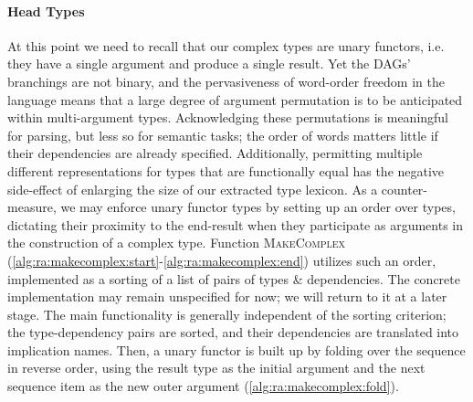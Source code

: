 \paragraph{Head Types}
At this point we need to recall that our complex types are unary functors, i.e. they have a single argument and produce a single result.
Yet the DAGs' branchings are not binary, and the pervasiveness of word-order freedom in the language means that a large degree of argument permutation is to be anticipated within multi-argument types.
Acknowledging these permutations is meaningful for parsing, but less so for semantic tasks; the order of words matters little if their dependencies are already specified.
Additionally, permitting multiple different representations for types that are functionally equal has the negative side-effect of enlarging the size of our extracted type lexicon.
As a counter-measure, we may enforce unary functor types by setting up an order over types, dictating their proximity to the end-result when they participate as arguments in the construction of a complex type.
Function \textsc{MakeComplex} (\ref{alg:ra:makecomplex:start}-\ref{alg:ra:makecomplex:end}) utilizes such an order, implemented as a sorting of a list of pairs of types \& dependencies.
The concrete implementation may remain unspecified for now; we will return to it at a later stage.
The main functionality is generally independent of the sorting criterion; the type-dependency pairs are sorted, and their dependencies are translated into implication names.
Then, a unary functor is built up by folding over the sequence in reverse order, using the result type as the initial argument and the next sequence item as the new outer argument (\ref{alg:ra:makecomplex:fold}).

